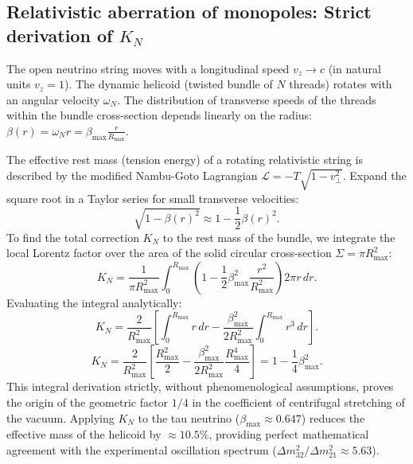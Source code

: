 \documentclass[11pt,a4paper]{article}
\begin{document}
\subsection{Relativistic aberration of monopoles: Strict derivation of $K_N$}
The open neutrino string moves with a longitudinal speed $v_z \to c$ (in natural units $v_z = 1$). The dynamic helicoid (twisted bundle of $N$ threads) rotates with an angular velocity $\omega_N$. The distribution of transverse speeds of the threads within the bundle cross-section depends linearly on the radius: $\beta(r) = \omega_N r = \beta_{\text{max}} \frac{r}{R_{\text{max}}}$.

The effective rest mass (tension energy) of a rotating relativistic string is described by the modified Nambu-Goto Lagrangian $\mathcal{L} = -T \sqrt{1 - v_\perp^2}$. Expand the square root in a Taylor series for small transverse velocities:
\begin{equation}
\sqrt{1 - \beta(r)^2} \approx 1 - \frac{1}{2} \beta(r)^2.
\end{equation}
To find the total correction $K_N$ to the rest mass of the bundle, we integrate the local Lorentz factor over the area of the solid circular cross-section $\Sigma = \pi R_{\text{max}}^2$:
\begin{equation}
K_N = \frac{1}{\pi R_{\text{max}}^2} \int_0^{R_{\text{max}}} \left( 1 - \frac{1}{2} \beta_{\text{max}}^2 \frac{r^2}{R_{\text{max}}^2} \right) 2\pi r \, dr.
\end{equation}
Evaluating the integral analytically:
\begin{equation}
K_N = \frac{2}{R_{\text{max}}^2} \left[ \int_0^{R_{\text{max}}} r \, dr - \frac{\beta_{\text{max}}^2}{2 R_{\text{max}}^2} \int_0^{R_{\text{max}}} r^3 \, dr \right].
\end{equation}
\begin{equation}
K_N = \frac{2}{R_{\text{max}}^2} \left[ \frac{R_{\text{max}}^2}{2} - \frac{\beta_{\text{max}}^2}{2 R_{\text{max}}^2} \frac{R_{\text{max}}^4}{4} \right] = 1 - \frac{1}{4} \beta_{\text{max}}^2.
\label{eq:k_factor}
\end{equation}
This integral derivation strictly, without phenomenological assumptions, proves the origin of the geometric factor $1/4$ in the coefficient of centrifugal stretching of the vacuum. Applying $K_N$ to the tau neutrino ($\beta_{\text{max}} \approx 0.647$) reduces the effective mass of the helicoid by $\approx 10.5\%$, providing perfect mathematical agreement with the experimental oscillation spectrum ($\Delta m^2_{32} / \Delta m^2_{21} \approx 5.63$).
\end{document}
